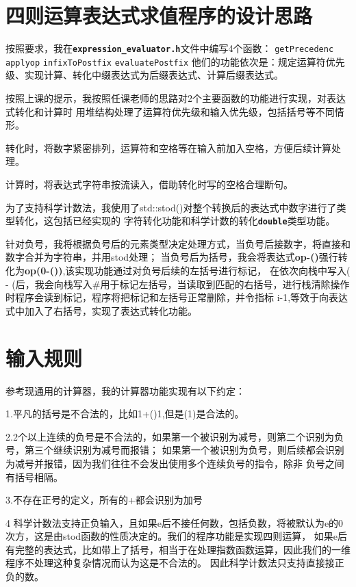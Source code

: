 \documentclass[UTF8]{ctexart}
\begin{document}
\pagestyle{fancy}
\fancyhead{}

\section{四则运算表达式求值程序的设计思路}
按照要求，我在\textbf{\texttt{expression\_evaluator.h}}文件中编写4个函数：
\texttt{getPrecedenc}
\texttt{applyop}
\texttt{infixToPostfix}
\texttt{evaluatePostfix}
他们的功能依次是：规定运算符优先级、实现计算、转化中缀表达式为后缀表达式、计算后缀表达式。\par
按照上课的提示，我按照任课老师的思路对2个主要函数的功能进行实现，对表达式转化和计算时
用堆结构处理了运算符优先级和输入优先级，包括括号等不同情形。\par
转化时，将数字紧密排列，运算符和空格等在输入前加入空格，方便后续计算处理。\par
计算时，将表达式字符串按流读入，借助转化时写的空格合理断句。\par
为了支持科学计数法，我使用了std::stod()对整个转换后的表达式中数字进行了类型转化，这包括已经实现的
字符转化功能和科学计数的转化\textbf{\texttt{double}}类型功能。\par
针对负号，我将根据负号后的元素类型决定处理方式，当负号后接数字，将直接和数字合并为字符串，并用stod处理；
当负号后为括号，我会将表达式\textbf{op-()}强行转化为\textbf{op(0-())},该实现功能通过对负号后续的左括号进行标记，
在依次向栈中写入( - (后，我会向栈写入\#用于标记左括号，当读取到匹配的右括号，进行栈清除操作时程序会读到标记，程序将把标记和左括号正常删除，并令指标
i-1,等效于向表达式中加入了右括号，实现了表达式转化功能。\par
\section{输入规则}
参考现通用的计算器，我的计算器功能实现有以下约定：\par
1.平凡的括号是不合法的，比如1+()1,但是(1)是合法的。\par
2.2个以上连续的负号是不合法的，如果第一个被识别为减号，则第二个识别为负号，第三个继续识别为减号而报错；
如果第一个被识别为负号，则后续都会识别为减号并报错，因为我们往往不会发出使用多个连续负号的指令，除非
负号之间有括号相隔。\par
3.不存在正号的定义，所有的+都会识别为加号\par
4 科学计数法支持正负输入，且如果e后不接任何数，包括负数，将被默认为e的0次方，这是由stod函数的性质决定的。我们的程序功能是实现四则运算，
如果e后有完整的表达式，比如带上了括号，相当于在处理指数函数运算，因此我们的一维程序不处理这种复杂情况而认为这是不合法的。
因此科学计数法只支持直接接正负的数。\par
\end{document}
